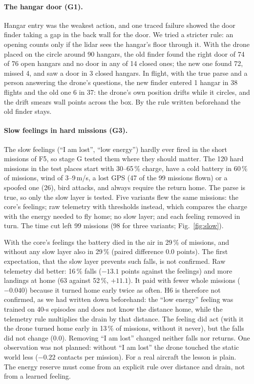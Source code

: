 \paragraph{The hangar door (G1).} Hangar entry was the weakest action, and one traced failure showed the door finder taking a gap
in the back wall for the door. We tried a stricter rule: an opening counts only if the lidar sees the hangar's floor through it.
With the drone placed on the circle around 90 hangars, the old finder found the right door of 74 of 76 open hangars and no door in
any of 14 closed ones; the new one found 72, missed 4, and saw a door in 3 closed hangars. In flight, with the true parse and a
person answering the drone's questions, the new finder entered 1 hangar in 38 flights and the old one 6 in 37: the drone's own
position drifts while it circles, and the drift smears wall points across the box. By the rule written beforehand the old finder
stays.

\paragraph{Slow feelings in hard missions (G3).} The slow feelings (``I am lost'', ``low energy'') hardly ever fired in the short
missions of F5, so stage G tested them where they should matter. The 120 hard missions in the test places start with 30--65\,\%
charge, have a cold battery in 60\,\% of missions, wind of 3--9\,m/s, a lost GPS (47 of the 99 missions flown) or a spoofed one (26), bird attacks, and always require
the return home. The parse is true, so only the slow layer is tested. Five variants flew the same missions: the core's feelings;
raw telemetry with thresholds instead, which compares the charge with the energy needed to fly home; no slow layer; and each
feeling removed in turn. The time cut left 99 missions (98 for three variants; Fig.~\ref{fig:slow}).

With the core's feelings the battery died in the air in 29\,\% of missions, and without any slow layer also in 29\,\% (paired
difference $0.0$ points). The first expectation, that the slow layer prevents such falls, is not confirmed. Raw
telemetry did better: 16\,\% falls ($-13.1$ points against the feelings) and more landings at home (63 against
52\,\%, $+11.1$). It paid with fewer whole missions ($-0.040$) because it turned home early twice
as often. H6 is therefore not confirmed, as we had written down beforehand: the ``low energy'' feeling was trained on 40-s
episodes and does not know the distance home, while the telemetry rule multiplies the drain by that distance. The feeling did act
(with it the drone turned home early in 13\,\% of missions, without it never), but the falls did not change ($0.0$).
Removing ``I am lost'' changed neither falls nor returns. One observation was not planned: without ``I am lost'' the drone touched
the static world less ($-0.22$ contacts per mission). For a real aircraft the lesson is plain. The energy reserve
must come from an explicit rule over distance and drain, not from a learned feeling.

